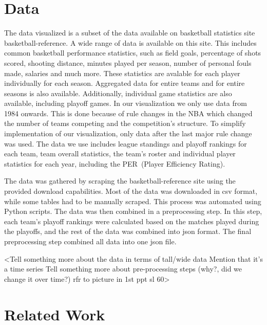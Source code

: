 \documentclass{sigchi}
\begin{document}
\section{Data}\label{sec:data}
The data visualized is a subset of the data available on basketball statistics
site basketball-reference\cite{basketball-reference}. A wide range of data is
available on this site. This includes common basketball performance statistics,
such as field goals, percentage of shots scored, shooting distance, minutes
played per season, number of personal fouls made, salaries and much more. These
statistics are avalable for each player individually for each season. Aggregated
data for entire teams and for entire seasons is also available. Additionally,
individual game statistics are also available, including playoff games.  In our
visualization we only use data from 1984 onwards. This is done because of rule
changes in the NBA which changed the number of teams competing and the
competition's structure. To simplify implementation of our visualization, only
data after the last major rule change was used.  The data we use includes league
standings and playoff rankings for each team, team overall statistics, the
team's roster and individual player statistics for each year, including the
PER~(Player Efficiency Rating)\cite{per}. 

The data was gathered by scraping the basketball-reference site using the
provided download capabilities. Most of the data was downloaded in csv format,
while some tables had to be manually scraped. This process was automated using
Python scripts. The data was then combined in a preprocessing step. In this
step, each team's playoff rankings were calculated based on the matches played
during the playoffs, and the rest of the data was combined into json format. The
final preprocessing step combined all data into one json file.

<Tell something more about the data in terms of tall/wide data
Mention that it's a time series
Tell something more about pre-processing steps (why?, did we change it over time?)
rfr to picture in 1st ppt sl 60>
\section{Related Work}\label{sec:literature}


\end{document}
